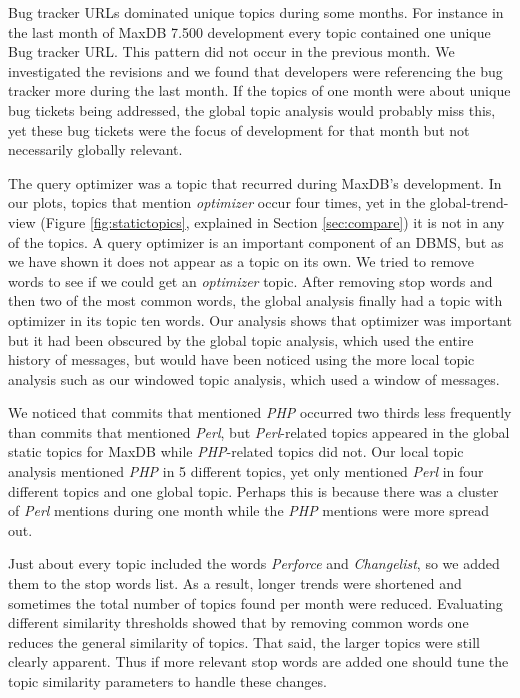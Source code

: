\documentclass[times, 10pt,twocolumn]{article}
\begin{document}
Bug tracker URLs dominated unique topics during some months. For
instance in the last month of MaxDB 7.500 development every topic
contained one unique Bug tracker URL. This pattern did not occur in the
previous month. We investigated the revisions and we found that
developers were referencing the bug tracker more during the last
month.  If the topics of one month were about unique bug tickets being
addressed, the global topic analysis would probably miss this, yet
these bug tickets were the focus of development for that month but not
necessarily globally relevant.

The query optimizer was a topic that recurred during MaxDB's
development. In our plots, topics that mention \emph{optimizer} occur
four times, yet in the global-trend-view (Figure
\ref{fig:statictopics}, explained in Section \ref{sec:compare}) it is not in any of the topics. A query
optimizer is an important component of an DBMS, but as we have shown
it does not appear as a topic on its own. We tried to remove words to
see if we could get an \emph{optimizer} topic. After removing stop
words and then two of the most common words, the global analysis
finally had a topic with optimizer in its topic ten words. Our
analysis shows that optimizer was important but it had been obscured
by the global topic analysis, which used the entire history of
messages, but would have been noticed using the more local topic
analysis such as our windowed topic analysis, which used a window of
messages.


We noticed that commits that mentioned \emph{PHP} occurred two thirds
less frequently than commits that mentioned \emph{Perl}, but
\emph{Perl}-related topics appeared in the global static topics for
MaxDB while \emph{PHP}-related topics did not.  Our local topic
analysis mentioned \emph{PHP} in 5 different topics, yet only
mentioned \emph{Perl} in four different topics and one global
topic. Perhaps this is because there was a cluster of \emph{Perl}
mentions during one month while the \emph{PHP} mentions were more
spread out.

Just about every topic included the words \emph{Perforce} and
\emph{Changelist}, so we added them to the stop words list. As a
result, longer trends were shortened and sometimes the total number of
topics found per month were reduced.  Evaluating different similarity
thresholds showed that by removing common words one reduces the
general similarity of topics. That said, the larger topics were still
clearly apparent. Thus if more relevant stop words are added one
should tune the topic similarity parameters to handle these changes.
\end{document}
